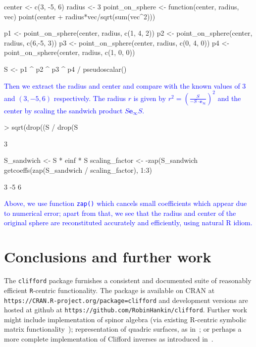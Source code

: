 \documentclass{birkjour}
\theoremstyle{definition}
\theoremstyle{remark}
\numberwithin{equation}{section}
\newcommand{\einf}{\mathbf{e}_\infty}
\begin{document}
%
\begin{Schunk}
\begin{Sinput}
center <- c(3, -5, 6)
radius <- 3
point_on_sphere  <- function(center, radius, vec){
  point(center + radius*vec/sqrt(sum(vec^2)))
}

p1 <- point_on_sphere(center, radius, c(1, 4, 2))
p2 <- point_on_sphere(center, radius, c(6,-5, 3))
p3 <- point_on_sphere(center, radius, c(0, 4, 0))
p4 <- point_on_sphere(center, radius, c(1, 0, 0))

S <- p1 ^ p2 ^ p3 ^ p4 / pseudoscalar()            
\end{Sinput}
\end{Schunk}
%
\textcolor{blue}{
Then we extract the radius and center and compare with the known
values of $3$ and $(3,-5,6)$ respectively.  The radius $r$ is given by
$r^2 = \left(\frac{S}{-S\cdot\einf}\right)^2$ and the center by
scaling the sandwich product $S\einf S$.}

\begin{Schunk}
\begin{Sinput}
> sqrt(drop((S / drop(S %
\end{Sinput}
\begin{Soutput}
[1]  3
\end{Soutput}
\begin{Sinput}
S_sandwich <- S * einf * S 
scaling_factor <- -zap(S_sandwich %
getcoeffs(zap(S_sandwich / scaling_factor), 1:3)
\end{Sinput}
\begin{Soutput}
[1]  3 -5 6
\end{Soutput}
\end{Schunk}
%
\textcolor{blue}{
Above, we use function {\tt zap()} which cancels small coefficients
which appear due to numerical error; apart from that, we see that the
radius and center of the original sphere are reconstituted accurately
and efficiently, using natural R idiom.}

\section{Conclusions and further work}

The {\tt clifford} package furnishes a consistent and documented suite
of reasonably efficient {\tt R}-centric functionality.  The package is
available on CRAN at
\verb+https://CRAN.R-project.org/package=clifford+ and development
versions are hosted at github at
\verb+https://github.com/RobinHankin/clifford+.  Further work might
include implementation of spinor algebra (via existing R-centric
symbolic matrix
functionality~\cite{hankin2023_jordan,hankin2006_onion});
representation of quadric surfaces, as in~\cite{breuils2018}; or
perhaps a more complete implementation of Clifford inverses as
introduced in~\cite{hitzer2017}.
\end{document}
